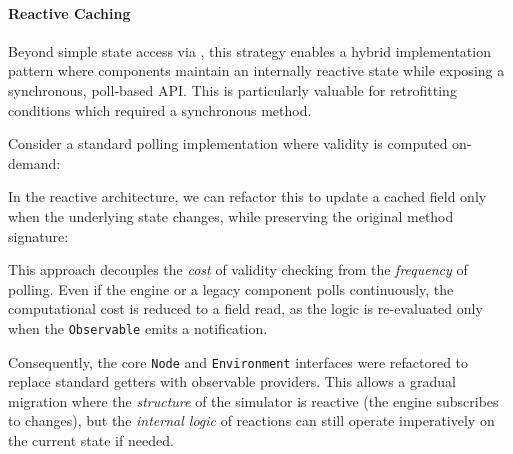 \paragraph{Reactive Caching}\label{par:reactive_caching}
Beyond simple state access via , this strategy enables a hybrid
implementation pattern where components maintain an internally reactive state
while exposing a synchronous, poll-based \ac{API}. This is particularly
valuable for retrofitting conditions which required a synchronous
\linebreak{} method.

Consider a standard polling implementation where validity is computed on-demand:


In the reactive architecture, we can refactor this to update a cached field
only when the underlying state changes, while preserving the original method
signature:


This approach decouples the \emph{cost} of validity checking from the
\emph{frequency} of polling. Even if the engine or a legacy component polls
 continuously, the computational cost is reduced to a field
read, as the logic is re-evaluated only when the \texttt{Observable}
emits a notification.
\newline
\par
Consequently, the core \texttt{Node} and \texttt{Environment} interfaces were
refactored to replace standard getters with observable providers. This allows a
gradual migration where the \emph{structure} of the simulator is reactive (the
engine subscribes to changes), but the \emph{internal logic} of reactions can
still operate imperatively on the current state if needed.

